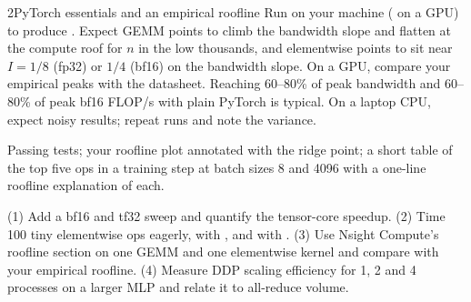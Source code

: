 \begin{labbox}{2}{PyTorch essentials and an empirical roofline}
Run  on your machine ( on a
GPU) to produce . Expect GEMM points to climb the bandwidth slope and flatten at the compute
roof for $n$ in the low thousands, and elementwise points to sit near $I=1/8$ (fp32) or $1/4$ (bf16) on the
bandwidth slope. On a GPU, compare your empirical peaks with the datasheet. Reaching 60--80\% of peak
bandwidth and 60--80\% of peak bf16 FLOP/s with plain PyTorch is typical. On a laptop CPU, expect noisy
results; repeat runs and note the variance.

Passing tests; your roofline plot annotated with the ridge point; a short table of the top five ops in a
training step at batch sizes 8 and 4096 with a one-line roofline explanation of each.

(1) Add a bf16 and tf32 sweep and quantify the tensor-core speedup. (2) Time 100 tiny elementwise ops eagerly,
with , and with . (3) Use Nsight Compute's roofline section on
one GEMM and one elementwise kernel and compare with your empirical roofline. (4) Measure DDP scaling efficiency
for 1, 2 and 4 processes on a larger MLP and relate it to all-reduce volume.
\end{labbox}
